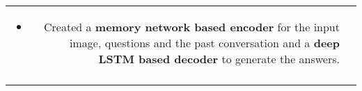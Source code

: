 \documentclass[a4paper,10pt]{article}
\begin{document}
\begin{longtable}{r|p{15cm}}
\begin{itemize}
\item Created a \textbf{memory network based encoder} for the input image, questions and the past conversation and a \textbf{deep LSTM based decoder} to generate the answers.\vspace*{-\baselineskip}
\end{itemize}\\
\multicolumn{2}{c}{}\\

\end{longtable}
\end{document}

